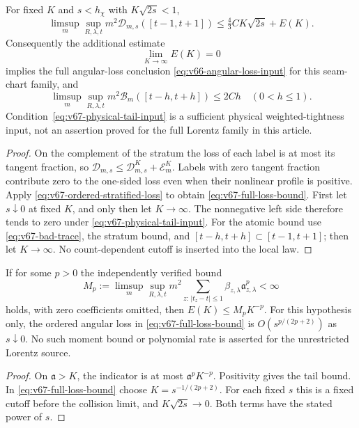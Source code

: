 \begin{proposition}
\label{prop:v67-angular-exhaustion}
For fixed $K$ and $s<h_\chi$ with $K\sqrt{2s}<1$,
\begin{equation}\label{eq:v67-full-loss-bound}
 \limsup_m\sup_{R,\lambda,t}m^2\mathcal D_{m,s}([t-1,t+1])
                  \le\tfrac43 C K\sqrt{2s}+E(K).
\end{equation}
Consequently the additional estimate
\begin{equation}\label{eq:v67-physical-tail-input}
                         \lim_{K\to\infty}E(K)=0
\end{equation}
implies the full angular-loss conclusion
\eqref{eq:v66-angular-loss-input} for this seam-chart family, and
\[
 \limsup_m\sup_{R,\lambda,t}m^2\mathcal B_m([t-h,t+h])
                                      \le2Ch\quad(0<h\le1).
\]
Condition~\eqref{eq:v67-physical-tail-input} is a sufficient physical
weighted-tightness input, not an assertion proved for the full Lorentz
family in this article.
\end{proposition}
\begin{proof}
On the complement of the stratum the loss of each label is at most
its tangent fraction, so
$\mathcal D_{m,s}\le\mathcal D^K_{m,s}+\mathcal E^K_m$.
Labels with zero tangent fraction contribute zero to the one-sided
loss even when their nonlinear profile is positive. Apply
\eqref{eq:v67-ordered-stratified-loss} to obtain
\eqref{eq:v67-full-loss-bound}. First let $s\downarrow0$ at fixed
$K$, and only then let $K\to\infty$. The nonnegative left side
therefore tends to zero under \eqref{eq:v67-physical-tail-input}.
For the atomic bound use \eqref{eq:v67-bad-trace}, the stratum bound,
and $[t-h,t+h]\subset[t-1,t+1]$; then let $K\to\infty$.
No count-dependent cutoff is inserted into the local law.
\end{proof}

\begin{corollary}
\label{cor:v67-angular-moment}
If for some $p>0$ the independently verified bound
\[
 M_p:=\limsup_m\sup_{R,\lambda,t}m^2
       \sum_{z:\,|t_z-t|\le1}
                  \beta_{z,\lambda}\mathfrak a_{z,\lambda}^{p}<\infty
\]
holds, with zero coefficients omitted, then $E(K)\le M_pK^{-p}$.
For this hypothesis only, the ordered angular loss in
\eqref{eq:v67-full-loss-bound} is $O(s^{p/(2p+2)})$ as $s\downarrow0$.
No such moment bound or polynomial rate is asserted for the unrestricted
Lorentz source.
\end{corollary}
\begin{proof}
On $\mathfrak a>K$, the indicator is at most
$\mathfrak a^pK^{-p}$. Positivity gives the tail bound. In
\eqref{eq:v67-full-loss-bound} choose
$K=s^{-1/(2p+2)}$. For each fixed $s$ this is a fixed cutoff before
the collision limit, and $K\sqrt{2s}\to0$. Both terms have the stated
power of $s$.
\end{proof}

